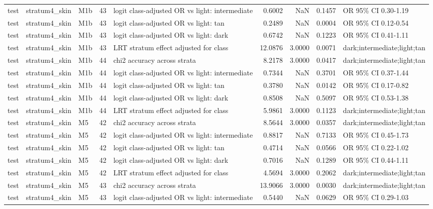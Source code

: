 \begin{tabular}{lllrlrrrl}
test & stratum4\_skin & M1b & 43 & logit class-adjusted OR vs light: intermediate & 0.6002 & NaN & 0.1457 & OR 95\% CI 0.30-1.19 \\
test & stratum4\_skin & M1b & 43 & logit class-adjusted OR vs light: tan & 0.2489 & NaN & 0.0004 & OR 95\% CI 0.12-0.54 \\
test & stratum4\_skin & M1b & 43 & logit class-adjusted OR vs light: dark & 0.6742 & NaN & 0.1223 & OR 95\% CI 0.41-1.11 \\
test & stratum4\_skin & M1b & 43 & LRT stratum effect adjusted for class & 12.0876 & 3.0000 & 0.0071 & dark;intermediate;light;tan \\
test & stratum4\_skin & M1b & 44 & chi2 accuracy across strata & 8.2178 & 3.0000 & 0.0417 & dark;intermediate;light;tan \\
test & stratum4\_skin & M1b & 44 & logit class-adjusted OR vs light: intermediate & 0.7344 & NaN & 0.3701 & OR 95\% CI 0.37-1.44 \\
test & stratum4\_skin & M1b & 44 & logit class-adjusted OR vs light: tan & 0.3780 & NaN & 0.0142 & OR 95\% CI 0.17-0.82 \\
test & stratum4\_skin & M1b & 44 & logit class-adjusted OR vs light: dark & 0.8508 & NaN & 0.5097 & OR 95\% CI 0.53-1.38 \\
test & stratum4\_skin & M1b & 44 & LRT stratum effect adjusted for class & 5.9861 & 3.0000 & 0.1123 & dark;intermediate;light;tan \\
test & stratum4\_skin & M5 & 42 & chi2 accuracy across strata & 8.5644 & 3.0000 & 0.0357 & dark;intermediate;light;tan \\
test & stratum4\_skin & M5 & 42 & logit class-adjusted OR vs light: intermediate & 0.8817 & NaN & 0.7133 & OR 95\% CI 0.45-1.73 \\
test & stratum4\_skin & M5 & 42 & logit class-adjusted OR vs light: tan & 0.4714 & NaN & 0.0566 & OR 95\% CI 0.22-1.02 \\
test & stratum4\_skin & M5 & 42 & logit class-adjusted OR vs light: dark & 0.7016 & NaN & 0.1289 & OR 95\% CI 0.44-1.11 \\
test & stratum4\_skin & M5 & 42 & LRT stratum effect adjusted for class & 4.5694 & 3.0000 & 0.2062 & dark;intermediate;light;tan \\
test & stratum4\_skin & M5 & 43 & chi2 accuracy across strata & 13.9066 & 3.0000 & 0.0030 & dark;intermediate;light;tan \\
test & stratum4\_skin & M5 & 43 & logit class-adjusted OR vs light: intermediate & 0.5440 & NaN & 0.0629 & OR 95\% CI 0.29-1.03 \\

\end{tabular}
